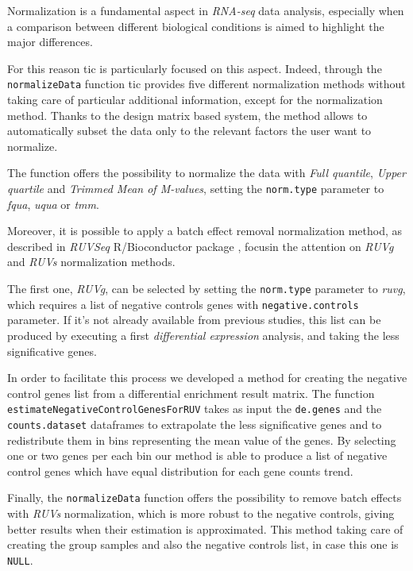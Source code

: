 Normalization is a fundamental aspect in \textit{RNA-seq} data analysis, especially when a comparison between different biological conditions is aimed to highlight the major differences.

For this reason \gls{tic} is particularly focused on this aspect. Indeed, through the \lstinline!normalizeData! function \gls{tic} provides five different normalization methods without taking care of particular additional information, except for the normalization method.
Thanks to the design matrix based system, the method allows to automatically subset the data only to the relevant factors the user want to normalize.

The function offers the possibility to normalize the data with \textit{Full quantile}, \textit{Upper quartile} and \textit{Trimmed Mean of M-values}, setting the \lstinline!norm.type! parameter to \textit{fqua}, \textit{uqua} or \textit{tmm}.

Moreover, it is possible to apply a batch effect removal normalization method, as described in \textit{RUVSeq} R/Bioconductor package \cite{Risso2014h}, focusin the attention on \textit{RUVg} and \textit{RUVs} normalization methods.

The first one, \textit{RUVg}, can be selected by setting the \lstinline!norm.type! parameter to \textit{ruvg}, which requires a list of negative controls genes with \lstinline!negative.controls! parameter.
If it's not already available from previous studies, this list can be produced by executing a first \textit{differential expression} analysis, and taking the less significative genes.

In order to facilitate this process we developed a method for creating the negative control genes list from a differential enrichment result matrix.
The function \lstinline!estimateNegativeControlGenesForRUV! takes as input the \lstinline!de.genes! and the \lstinline!counts.dataset! dataframes to extrapolate the less significative genes and to redistribute them in bins representing the mean value of the genes.
By selecting one or two genes per each bin our method is able to produce a list of negative control genes which have equal distribution for each gene counts trend.

Finally, the \lstinline!normalizeData! function offers the possibility to remove batch effects with \textit{RUVs} normalization, which is more robust to the negative controls, giving better results when their estimation is approximated.
This method taking care of creating the group samples and also the negative controls list, in case this one is \lstinline!NULL!.
